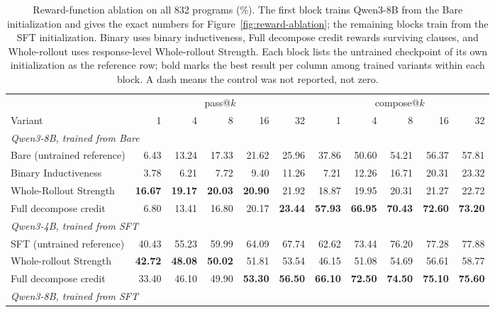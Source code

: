 \begin{table}[H]
\centering
\small
\setlength{\tabcolsep}{2.4pt}
\caption{Reward-function ablation on all 832 programs (\%).  The first block
  trains Qwen3-8B from the Bare initialization and gives the exact numbers for
  Figure~\ref{fig:reward-ablation}; the remaining blocks train from the SFT
  initialization.  Binary uses binary inductiveness, Full decompose credit
  rewards surviving clauses, and Whole-rollout uses response-level
  Whole-rollout Strength.  Each block lists the untrained checkpoint of its
  own initialization as the reference row; bold marks the best result per
  column among trained variants within each block.  A dash means the control
  was not reported, not zero.}
\label{tab:reward-ablation}
\begin{tabular}{lrrrrrrrrrr}
\toprule
\rowcolor{algobg}
& \multicolumn{5}{c}{pass@\(k\)} & \multicolumn{5}{c}{compose@\(k\)} \\
\headercmidrules{\cmidrule(lr){2-6}\cmidrule(lr){7-11}}
\rowcolor{algobg}
Variant & 1 & 4 & 8 & 16 & 32 & 1 & 4 & 8 & 16 & 32 \\
\midrule
\multicolumn{11}{l}{\textit{Qwen3-8B, trained from Bare}} \\
Bare (untrained reference)
  & 6.43 & 13.24 & 17.33 & 21.62 & 25.96
  & 37.86 & 50.60 & 54.21 & 56.37 & 57.81 \\
Binary Inductiveness
  & 3.78 & 6.21 & 7.72 & 9.40 & 11.26
  & 7.21 & 12.26 & 16.71 & 20.31 & 23.32 \\
Whole-Rollout Strength
  & \textbf{16.67} & \textbf{19.17} & \textbf{20.03} & \textbf{20.90}
  & 21.92
  & 18.87 & 19.95 & 20.31 & 21.27 & 22.72 \\
Full decompose credit
  & 6.80 & 13.41 & 16.80 & 20.17 & \textbf{23.44}
  & \textbf{57.93} & \textbf{66.95} & \textbf{70.43} & \textbf{72.60} & \textbf{73.20} \\
\midrule
\multicolumn{11}{l}{\textit{Qwen3-4B, trained from SFT}} \\
SFT (untrained reference)
  & 40.43 & 55.23 & 59.99 & 64.09 & 67.74
  & 62.62 & 73.44 & 76.20 & 77.28 & 77.88 \\
Whole-rollout Strength
  & \textbf{42.72} & \textbf{48.08} & \textbf{50.02} & 51.81 & 53.54
  & 46.15 & 51.08 & 54.69 & 56.61 & 58.77 \\
Full decompose credit
  & 33.40 & 46.10 & 49.90 & \textbf{53.30} & \textbf{56.50}
  & \textbf{66.10} & \textbf{72.50} & \textbf{74.50} & \textbf{75.10} & \textbf{75.60} \\
\midrule
\multicolumn{11}{l}{\textit{Qwen3-8B, trained from SFT}} \\

\end{tabular}
\end{table}

